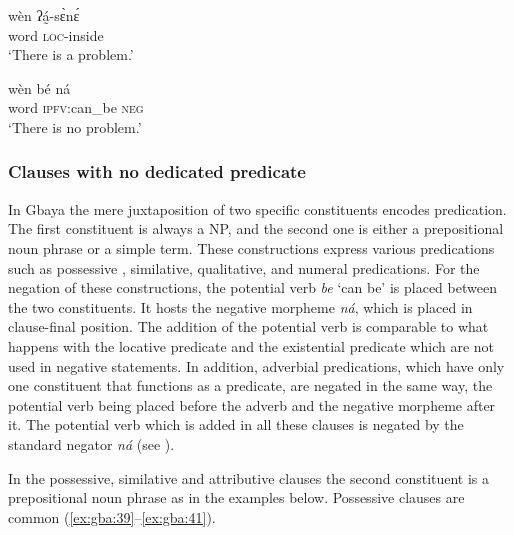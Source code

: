 \documentclass[output=paper,colorlinks=true, citecolor=brown]{langscibook}
\begin{document}
\ea\label{ex:gba:37}
    \gll wèn ʔá̰-sɛ̀nɛ́  \\ 
          word \textsc{loc-}inside \\
    \glt ‘There is a problem.’
\z 
    

\ea\label{ex:gba:38}
    \gll wèn bé ná  \\ 
         word \textsc{ipfv}:can\_be \textsc{neg}  \\
    \glt ‘There is no problem.’
\z 

\subsubsection{Clauses with no dedicated predicate} \label{sec:gba:2.3.2}

In Gbaya the mere juxtaposition of two specific constituents encodes predication. The first constituent is always a NP, and the second one is either a prepositional noun phrase or a simple term. These constructions express various predications such as possessive , similative, qualitative, and numeral predications. For the negation of these constructions, the potential verb \textit{be} ‘can be’ is placed between the two constituents. It hosts the negative morpheme \textit{ná}, which is placed in clause-final position. The addition of the potential verb is comparable to what happens with the locative predicate and the existential predicate which are not used in negative statements. In addition, adverbial predications, which have only one constituent that functions as a predicate, are negated in the same way, the potential verb being placed before the adverb and the negative morpheme after it. The potential verb which is added in all these clauses is negated by the standard negator \textit{ná} (see ). 

\begin{table}
\caption{Negation of clauses with no dedicated predicate}
\label{tab:gba:5}
\end{table}
In the possessive, similative and attributive clauses the second constituent is a prepositional noun phrase as in the examples below. 
Possessive clauses are common (\ref{ex:gba:39}--\ref{ex:gba:41}).
\end{document}
